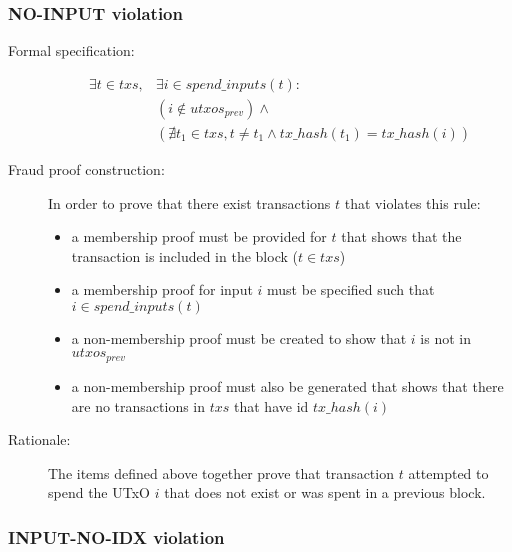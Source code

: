 \documentclass[../midgard.tex]{subfiles}
\begin{document}
\subsubsection{NO-INPUT violation}
\label{violation:NO-INPUT}

\begin{description}

\item[Formal specification:]
\begin{equation*}
\begin{split}
    \exists t \in txs, &\exists i \in spend\_inputs(t): \\
    &( i \notin utxos_{prev} ) \land  \\
    &( \nexists t_1 \in txs, t \neq t_1 \land tx\_hash(t_1) = tx\_hash(i) )
\end{split}
\end{equation*}

\item[Fraud proof construction:] In order to prove that there exist transactions $t$ that violates this rule:
\begin{itemize}
    \item a membership proof must be provided for $t$ that shows that the transaction is included in the block ($t \in txs$)
    \item a membership proof for input $i$ must be specified such that $i \in spend\_inputs(t)$
    \item a non-membership proof must be created to show that $i$ is not in $utxos_{prev}$
    \item a non-membership proof must also be generated that shows that there are no transactions in $txs$ that have id $tx\_hash(i)$
\end{itemize}

\item[Rationale:] The items defined above together prove that transaction $t$ attempted to spend the UTxO $i$ that does not exist or was spent in a previous block.

\end{description}

\subsubsection{INPUT-NO-IDX violation}
\label{violation:INPUT-NO-IDX}
\end{document}
